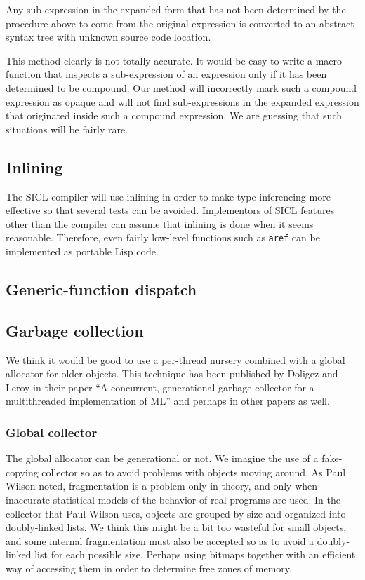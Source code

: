 \documentclass{article}
\begin{document}
Any sub-expression in the expanded form that has not been determined
by the procedure above to come from the original expression is
converted to an abstract syntax tree with unknown source code
location.

This method clearly is not totally accurate.  It would be easy to
write a macro function that inspects a sub-expression of an expression
only if it has been determined to be compound.  Our method will
incorrectly mark such a compound expression as opaque and will not
find sub-expressions in the expanded expression that originated inside
such a compound expression.  We are guessing that such situations will
be fairly rare. 

\subsection{Inlining}
\label{section-inlining}

The SICL compiler will use inlining in order to make type inferencing
more effective so that several tests can be avoided.  Implementors of
SICL features other than the compiler can assume that inlining is done
when it seems reasonable.  Therefore, even fairly low-level functions
such as \texttt{aref} can be implemented as portable Lisp code. 

\subsection{Generic-function dispatch}

\subsection{Garbage collection}

We think it would be good to use a per-thread nursery combined with a
global allocator for older objects.  This technique has been published
by Doligez and Leroy in their paper ``A concurrent, generational
garbage collector for a multithreaded implementation of ML'' and
perhaps in other papers as well.

\subsubsection{Global collector}
The global allocator can be generational or not.  We imagine the use
of a fake-copying collector so as to avoid problems with objects
moving around.  As Paul Wilson noted, fragmentation is a problem only
in theory, and only when inaccurate statistical models of the behavior
of real programs are used.  In the collector that Paul Wilson uses,
objects are grouped by size and organized into doubly-linked lists.
We think this might be a bit too wasteful for small objects, and some
internal fragmentation must also be accepted so as to avoid a
doubly-linked list for each possible size.  Perhaps using bitmaps
together with an efficient way of accessing them in order to determine
free zones of memory.
\end{document}

